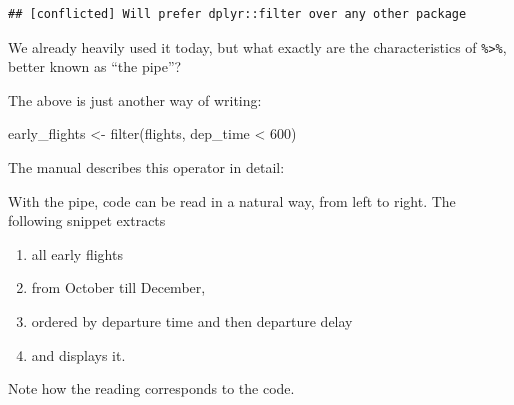 \documentclass[]{book}
\newenvironment{Shaded}{}{}
\newcommand{\DecValTok}[1]{#1}
\newcommand{\KeywordTok}[1]{\textcolor[rgb]{0.00,0.00,1.00}{#1}}
\newcommand{\NormalTok}[1]{#1}
\newcommand{\OperatorTok}[1]{#1}
\newcommand{\StringTok}[1]{\textcolor[rgb]{0.00,0.50,0.50}{#1}}
\providecommand{\tightlist}{%
  \setlength{\itemsep}{0pt}\setlength{\parskip}{0pt}}
\begin{document}
\begin{verbatim}
## [conflicted] Will prefer dplyr::filter over any other package
\end{verbatim}

We already heavily used it today, but what exactly are the characteristics of \texttt{\%\textgreater{}\%}, better known as ``the pipe''?

\begin{Shaded}
\end{Shaded}

The above is just another way of writing:

\begin{Shaded}
\begin{Highlighting}[]
\NormalTok{early_flights <-}\StringTok{ }\KeywordTok{filter}\NormalTok{(flights, dep_time }\OperatorTok{<}\StringTok{ }\DecValTok{600}\NormalTok{)}
\end{Highlighting}
\end{Shaded}

The manual describes this operator in detail:

\begin{Shaded}
\end{Shaded}

With the pipe, code can be read in a natural way, from left to right.
The following snippet extracts

\begin{enumerate}
\def\labelenumi{\arabic{enumi}.}
\tightlist
\item
  all early flights
\item
  from October till December,
\item
  ordered by departure time and then departure delay
\item
  and displays it.
\end{enumerate}

Note how the reading corresponds to the code.

\begin{Shaded}
\end{Shaded}
\end{document}
